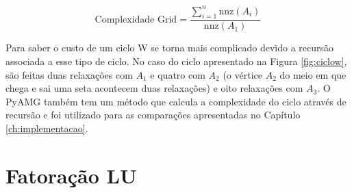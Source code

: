 \begin{equation}\label{eq:complexidadegrid}
    \text{Complexidade Grid} = \frac{\sum_{i=1}^n \text{nnz}(A_i)}{\text{nnz}(A_1)}
\end{equation}

Para saber o custo de um ciclo W se torna mais complicado devido a recursão associada a esse tipo de ciclo. No caso do ciclo apresentado na Figura \ref{fig:ciclow}, são feitas duas relaxações com $A_1$ e quatro com $A_2$ (o vértice $A_2$ do meio em que chega e sai uma seta acontecem duas relaxações) e oito relaxações com $A_3$. O PyAMG também tem um método que calcula a complexidade do ciclo através de recursão e foi utilizado para as comparações apresentadas no Capítulo \ref{ch:implementacao}. 







\section{Fatoração LU} \label{sec:fatoracaolu}

